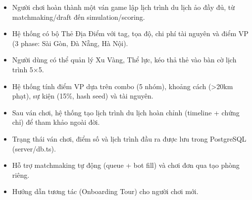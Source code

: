 \begin{itemize}[topsep=0pt, itemsep=2.5pt, leftmargin=1.5cm]
    \item Người chơi hoàn thành một ván game lập lịch trình du lịch ảo đầy đủ, từ matchmaking/draft đến simulation/scoring.
    \item Hệ thống có bộ Thẻ Địa Điểm với tag, tọa độ, chi phí tài nguyên và điểm VP (3 phase: Sài Gòn, Đà Nẵng, Hà Nội).
    \item Người dùng có thể quản lý Xu Vàng, Thể lực, kéo thả thẻ vào bàn cờ lịch trình 5×5.
    \item Hệ thống tính điểm VP dựa trên combo (5 nhóm), khoảng cách (>20km phạt), sự kiện (15\%, hash seed) và tài nguyên.
    \item Sau ván chơi, hệ thống tạo lịch trình du lịch hoàn chỉnh (timeline + chứng chỉ) để tham khảo ngoài đời.
    \item Trạng thái ván chơi, điểm số và lịch trình đầu ra được lưu trong PostgreSQL (server/db.ts).
    \item Hỗ trợ matchmaking tự động (queue + bot fill) và chơi đơn qua tạo phòng riêng.
    \item Hướng dẫn tương tác (Onboarding Tour) cho người chơi mới.
\end{itemize}